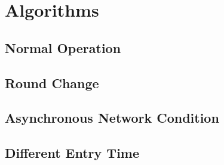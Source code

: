 \chapter{Algorithms}
\label{c:algo}

\section{Normal Operation}
\section{Round Change}
\section{Asynchronous Network Condition}
\section{Different Entry Time}